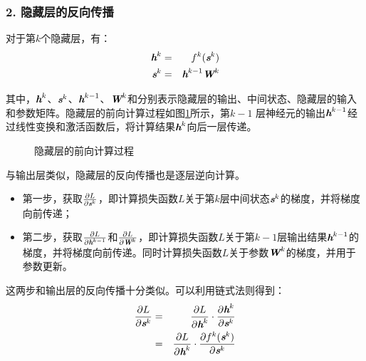 
\subsubsection{2. 隐藏层的反向传播}

\parinterval  对于第$ k $个隐藏层，有：
\begin{eqnarray}
{\textbf{\em h}}^k&=&f^k({\textbf{\em s}}^k) \label{eq:9-52}\\
{\textbf{\em s}}^k&=&{\textbf{\em h}}^{k-1}{\textbf{\em W}}^k
\label{eq:9-53}
\end{eqnarray}

\noindent  其中，$ {\textbf{\em h}}^k $、$ {\textbf{\em s}}^k $、$ {\textbf{\em h}}^{k-1} $、${\textbf{\em W}}^k $和分别表示隐藏层的输出、中间状态、隐藏层的输入和参数矩阵。隐藏层的前向计算过程如图\ref{fig:9-56}所示，第$ k-1 $ 层神经元的输出$  {\textbf{\em h}}^{k-1} $经过线性变换和激活函数后，将计算结果$ {\textbf{\em h}}^k $向后一层传递。

\begin{figure}[htp]
\centering

\caption{隐藏层的前向计算过程}
\label{fig:9-56}
\end{figure}

\parinterval  与输出层类似，隐藏层的反向传播也是逐层逆向计算。

\begin{itemize}
\vspace{0.5em}
\item 第一步，获取$\frac{\partial L}{\partial {\textbf{\em s}}^k} $，即计算损失函数$ L $关于第$ k $层中间状态$ {\textbf{\em s}}^k$的梯度，并将梯度向前传递；
\vspace{0.5em}
\item 第二步，获取$\frac{\partial L}{\partial {\textbf{\em h}}^{k-1}} $和$\frac{\partial L}{\partial {\textbf{\em W}}^k} $，即计算损失函数$ L $关于第$ k-1 $层输出结果$ {\textbf{\em h}}^{k-1} $的梯度，并将梯度向前传递。同时计算损失函数$ L $关于参数$ {\textbf{\em W}}^k $的梯度，并用于参数更新。
\vspace{0.5em}
\end{itemize}

\parinterval  这两步和输出层的反向传播十分类似。可以利用链式法则得到：
\begin{eqnarray}
\frac{\partial L}{\partial {\textbf{\em s}}^k}&=&\frac{\partial L}{\partial {\textbf{\em h}}^k}\cdot \frac{\partial {\textbf{\em h}}^k}{\partial {\textbf{\em s}}^k}\nonumber\\
&=&\frac{\partial L}{\partial {\textbf{\em h}}^k}\cdot \frac{\partial f^k({\textbf{\em s}}^k)}{\partial {\textbf{\em s}}^k}
\label{eq:9-54}
\end{eqnarray}

